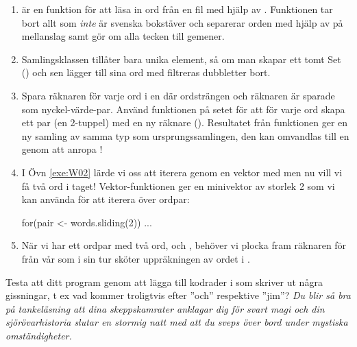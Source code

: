 \begin{enumerate}
\item {} är en funktion för att läsa in ord från en fil med hjälp av . Funktionen tar bort allt som {\em inte} är svenska bokstäver och separerar orden med hjälp av  på mellanslag samt gör om alla tecken till gemener.

\item Samlingsklassen  tillåter bara unika element, så om man skapar ett tomt Set () och sen lägger till sina ord med \code{++}  filtreras dubbletter bort.

\item Spara räknaren för varje ord i en  där ordsträngen och räknaren är sparade som nyckel-värde-par. Använd funktionen  på setet för att för varje ord  skapa ett par (en 2-tuppel) med en ny räknare (). Resultatet från funktionen  ger en ny samling av samma typ som ursprungssamlingen, den kan omvandlas till en  genom att anropa !

\item I Övn \ref{exe:W02} lärde vi oss att iterera genom en vektor med  men nu vill vi få två ord i taget! Vektor-funktionen  ger en minivektor av storlek 2 som vi kan använda för att iterera över ordpar:
\begin{Code}
for(pair <- words.sliding(2)) { ... }
\end{Code}

\item När vi har ett ordpar med två ord,  och , behöver vi plocka fram räknaren för  från vår  som i sin tur sköter uppräkningen av ordet  i .

\end{enumerate}

\Subtask Testa att ditt program genom att lägga till kodrader i   som skriver ut några gissningar, t ex vad kommer troligtvis efter ''och'' respektive ''jim''?
\newline
\newline
\noindent
\emph{Du blir så bra på tankeläsning att dina skeppskamrater anklagar dig för svart magi och din sjörövarhistoria slutar en stormig natt med att du sveps över bord under mystiska omständigheter.}



